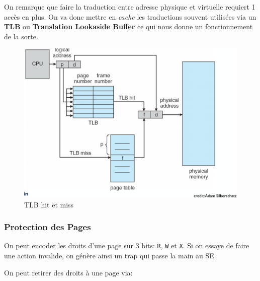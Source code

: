 On remarque que faire la traduction entre adresse physique et virtuelle
requiert 1 accès en plus. On va donc mettre en \emph{cache} les
traductions souvent utilisées via un \textbf{TLB} ou \textbf{Translation
Lookaside Buffer} ce qui nous donne un fonctionnement de la sorte.

\begin{figure}
\centering
\includegraphics{image-56.png}
\caption{TLB hit et miss}
\end{figure}

\subsubsection{Protection des Pages}\label{protection-des-pages}

On peut encoder les droits d'une page sur 3 bits: \texttt{R}, \texttt{W}
et \texttt{X}. Si on essaye de faire une action invalide, on génère
ainsi un trap qui passe la main au SE.

On peut retirer des droits à une page via:

\begin{Shaded}
\begin{Highlighting}[]
\PreprocessorTok{ }

\OperatorTok{(}  \OperatorTok{*}\OperatorTok{,} \OperatorTok{,} \OperatorTok{);}
\end{Highlighting}
\end{Shaded}

